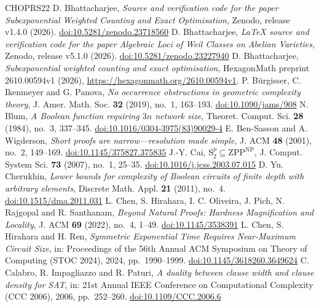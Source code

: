 \documentclass[11pt,reqno]{amsart}
\numberwithin{equation}{section}
\theoremstyle{plain}
\theoremstyle{definition}
\theoremstyle{remark}
\begin{document}
\begin{thebibliography}{CHOPRS22}
 D. Bhattacharjee, \emph{Source and verification code for the paper Subexponential Weighted Counting and Exact Optimisation}, Zenodo, release v1.4.0 (2026). \href{https://doi.org/10.5281/zenodo.23718560}{doi:10.5281/zenodo.23718560}
 D. Bhattacharjee, \emph{LaTeX source and verification code for the paper Algebraic Loci of Weil Classes on Abelian Varieties}, Zenodo, release v5.1.0 (2026). \href{https://doi.org/10.5281/zenodo.23227940}{doi:10.5281/zenodo.23227940}
 D. Bhattacharjee, \emph{Subexponential weighted counting and exact optimisation}, HexagonMath preprint 2610.00594v1 (2026), \url{https://hexagonmath.org/2610.00594v1}.
 P. B{\"u}rgisser, C. Ikenmeyer and G. Panova, \emph{No occurrence obstructions in geometric complexity theory}, J. Amer. Math. Soc. \textbf{32} (2019), no.~1, 163--193. \href{https://doi.org/10.1090/jams/908}{doi:10.1090/jams/908}
 N. Blum, \emph{A Boolean function requiring $3n$ network size}, Theoret. Comput. Sci. \textbf{28} (1984), no.~3, 337--345. \href{https://doi.org/10.1016/0304-3975(83)90029-4}{doi:10.1016/0304-3975(83)90029-4}
 E. Ben-Sasson and A. Wigderson, \emph{Short proofs are narrow---resolution made simple}, J. ACM \textbf{48} (2001), no.~2, 149--169. \href{https://doi.org/10.1145/375827.375835}{doi:10.1145/375827.375835}
 J.-Y. Cai, \emph{$\mathrm{S}_2^p\subseteq\mathrm{ZPP}^{\mathrm{NP}}$}, J. Comput. System Sci. \textbf{73} (2007), no.~1, 25--35. \href{https://doi.org/10.1016/j.jcss.2003.07.015}{doi:10.1016/j.jcss.2003.07.015}
 D. Yu. Cherukhin, \emph{Lower bounds for complexity of Boolean circuits of finite depth with arbitrary elements}, Discrete Math. Appl. \textbf{21} (2011), no.~4. \href{https://doi.org/10.1515/dma.2011.031}{doi:10.1515/dma.2011.031}
 L. Chen, S. Hirahara, I. C. Oliveira, J. Pich, N. Rajgopal and R. Santhanam, \emph{Beyond Natural Proofs: Hardness Magnification and Locality}, J. ACM \textbf{69} (2022), no.~4, 1--49. \href{https://doi.org/10.1145/3538391}{doi:10.1145/3538391}
 L. Chen, S. Hirahara and H. Ren, \emph{Symmetric Exponential Time Requires Near-Maximum Circuit Size}, in: Proceedings of the 56th Annual ACM Symposium on Theory of Computing (STOC 2024), 2024, pp.~1990--1999. \href{https://doi.org/10.1145/3618260.3649624}{doi:10.1145/3618260.3649624}
 C. Calabro, R. Impagliazzo and R. Paturi, \emph{A duality between clause width and clause density for SAT}, in: 21st Annual IEEE Conference on Computational Complexity (CCC 2006), 2006, pp.~252--260. \href{https://doi.org/10.1109/CCC.2006.6}{doi:10.1109/CCC.2006.6}

\end{thebibliography}
\end{document}
